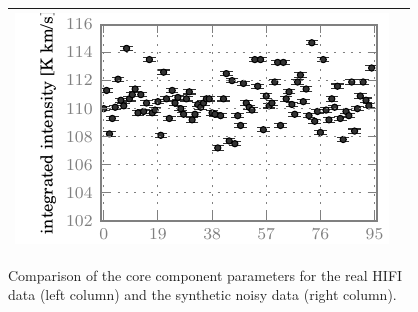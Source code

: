 \begin{figure}[p]
\begin{tabular}{@{}c@{}c@{}}
            \includegraphics{spread_87_core_iint_noisy}    \\
            \bottomrule
        \end{tabular}
        \caption{
            Comparison of the  core component parameters
            for the real HIFI data (left column)
            and the synthetic noisy data (right column).
        }
        \label{fig:fit_core_87}
    \end{figure}
